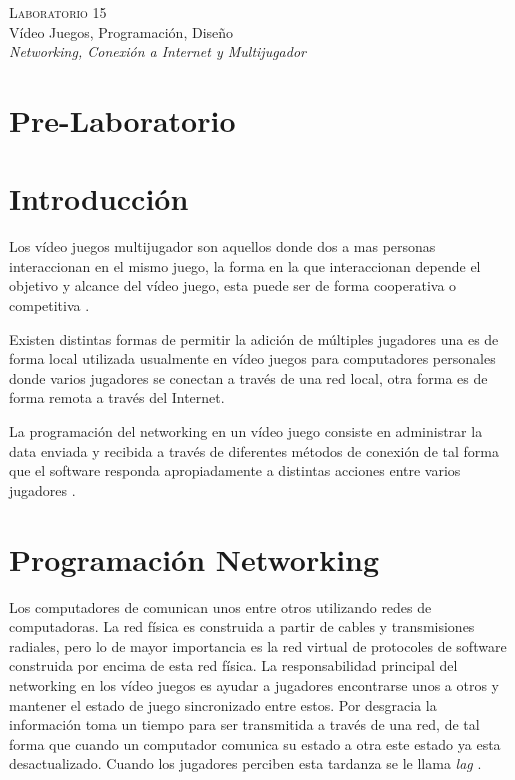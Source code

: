 \begin{center}
\textsc{\Large Laboratorio 15}~\\
{\large Vídeo Juegos, Programación, Diseño}~\\
\emph{Networking, Conexión a Internet y Multijugador}
\end{center}

\section{Pre-Laboratorio}

\section{Introducción}
Los vídeo juegos multijugador son aquellos donde dos a mas personas interaccionan en el mismo juego, la forma en la que interaccionan depende el objetivo y alcance del vídeo juego, esta puede ser de forma cooperativa o competitiva \cite{valve_networking}.

Existen distintas formas de permitir la adición de múltiples jugadores una es de forma local utilizada usualmente en vídeo juegos para computadores personales donde varios jugadores se conectan a través de una red local, otra forma es de forma remota a través del Internet.

La programación del networking en un vídeo juego consiste en administrar la data enviada y recibida a través de diferentes métodos de conexión de tal forma que el software responda apropiadamente a distintas acciones entre varios jugadores \cite[p.~355]{jenkinscreatinggames}.

\section{Programación Networking}
Los computadores de comunican unos entre otros utilizando redes de computadoras. La red física es construida a partir de cables y transmisiones radiales, pero lo de mayor importancia es la red virtual de protocoles de software construida por encima de esta red física. La responsabilidad principal del networking en los vídeo juegos es ayudar a jugadores encontrarse unos a otros y mantener el estado de juego sincronizado entre estos. Por desgracia la información toma un tiempo para ser transmitida a través de una red, de tal forma que cuando un computador comunica su estado a otra este estado ya esta desactualizado. Cuando los jugadores perciben esta tardanza se le llama \emph{lag} \cite[p.~356]{jenkinscreatinggames}.

